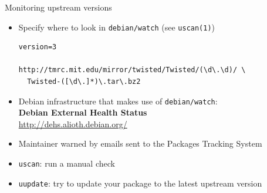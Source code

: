 \documentclass[10pt,final]{beamer}
\begin{document}
\begin{frame}[fragile]{Monitoring upstream versions}
\begin{itemize}
\item Specify where to look in \texttt{debian/watch} (see \texttt{uscan(1)})
\begin{lstlisting}[basicstyle=\ttfamily\footnotesize]
version=3

http://tmrc.mit.edu/mirror/twisted/Twisted/(\d\.\d)/ \
  Twisted-([\d\.]*)\.tar\.bz2
\end{lstlisting}
	\br
\item Debian infrastructure that makes use of \texttt{debian/watch}:\\
	\textbf{Debian External Health Status}\\
	\url{http://dehs.alioth.debian.org/}
	\br
\item Maintainer warned by emails sent to the Packages Tracking System
\br
\item \texttt{uscan}: run a manual check
\br
\item \texttt{uupdate}: try to update your package to the latest upstream version
\end{itemize}
\end{frame}
\end{document}

